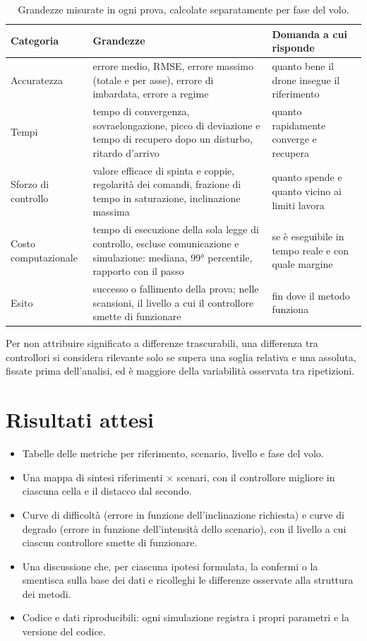 \documentclass[11pt,a4paper]{article}
\begin{document}
\begin{table}[tb]
\centering
\caption{Grandezze misurate in ogni prova, calcolate separatamente per fase del volo.}
\label{tab:metriche}
\begin{tabularx}{\textwidth}{@{}l L L@{}}
\toprule
Categoria & Grandezze & Domanda a cui risponde \\
\midrule
Accuratezza & errore medio, RMSE, errore massimo (totale e per asse), errore di imbardata, errore a regime & quanto bene il drone insegue il riferimento \\ \addlinespace
Tempi & tempo di convergenza, sovraelongazione, picco di deviazione e tempo di recupero dopo un disturbo, ritardo d'arrivo & quanto rapidamente converge e recupera \\ \addlinespace
Sforzo di controllo & valore efficace di spinta e coppie, regolarità dei comandi, frazione di tempo in saturazione, inclinazione massima & quanto spende e quanto vicino ai limiti lavora \\ \addlinespace
Costo computazionale & tempo di esecuzione della sola legge di controllo, escluse comunicazione e simulazione: mediana, 99° percentile, rapporto con il passo & se è eseguibile in tempo reale e con quale margine \\ \addlinespace
Esito & successo o fallimento della prova; nelle scansioni, il livello a cui il controllore smette di funzionare & fin dove il metodo funziona \\
\bottomrule
\end{tabularx}
\end{table}

Per non attribuire significato a differenze trascurabili, una differenza tra controllori si considera rilevante solo se supera una soglia relativa e una assoluta, fissate prima dell'analisi, ed è maggiore della variabilità osservata tra ripetizioni.

\section{Risultati attesi}

\begin{itemize}
  \item Tabelle delle metriche per riferimento, scenario, livello e fase del volo.
  \item Una mappa di sintesi riferimenti $\times$ scenari, con il controllore migliore in ciascuna cella e il distacco dal secondo.
  \item Curve di difficoltà (errore in funzione dell'inclinazione richiesta) e curve di degrado (errore in funzione dell'intensità dello scenario), con il livello a cui ciascun controllore smette di funzionare.
  \item Una discussione che, per ciascuna ipotesi formulata, la confermi o la smentisca sulla base dei dati e ricolleghi le differenze osservate alla struttura dei metodi.
  \item Codice e dati riproducibili: ogni simulazione registra i propri parametri e la versione del codice.
\end{itemize}
\end{document}
